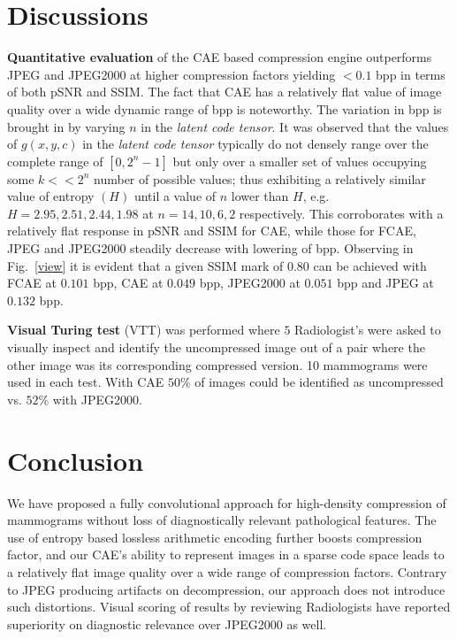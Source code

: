\documentclass[10pt,twocolumn,letterpaper]{article}
\begin{document}
\section{Discussions}

\textbf{Quantitative evaluation} of the CAE based compression engine outperforms JPEG and JPEG2000 at higher compression factors yielding $<0.1$ bpp in terms of both pSNR and SSIM. The fact that CAE has a relatively flat value of image quality over a wide dynamic range of bpp is noteworthy. The variation in bpp is brought in by varying $n$ in the \emph{latent code tensor}. It was observed that the values of $g(x,y,c)$ in the \emph{latent code tensor} typically do not densely range over the complete range of $[0,2^n-1]$ but only over a smaller set of values occupying some $k<<2^n$ number of possible values; thus exhibiting a relatively similar value of entropy $(H)$ until a value of $n$ lower than $H$, e.g. $H=2.95,2.51, 2.44, 1.98$ at $n=14, 10, 6, 2$ respectively. This corroborates with a relatively flat response in pSNR and SSIM for CAE, while those for FCAE, JPEG and JPEG2000 steadily decrease with lowering of bpp. Observing in Fig.~\ref{view} it is evident that a given SSIM mark of $0.80$ can be achieved with FCAE at $0.101$ bpp, CAE at $0.049$ bpp, JPEG2000 at $0.051$ bpp and JPEG at $0.132$ bpp.

\textbf{Visual Turing test} (VTT) was performed where $5$ Radiologist's were asked to visually inspect and identify the uncompressed image out of a pair where the other image was its corresponding compressed version. 10 mammograms were used in each test. With CAE $50\%$ of images could be identified as uncompressed vs. $52\%$ with JPEG2000.

\section{Conclusion}

We have proposed a fully convolutional approach for high-density compression of mammograms without loss of diagnostically relevant  pathological features. The use of entropy based lossless arithmetic encoding further boosts compression factor, and our CAE's ability to represent images in a sparse code space leads to a relatively flat image quality over a wide range of compression factors. Contrary to JPEG producing artifacts on decompression, our approach does not introduce such distortions. Visual scoring of results by reviewing Radiologists have reported superiority on diagnostic relevance over JPEG2000 as well.


{\small


}
\end{document}

